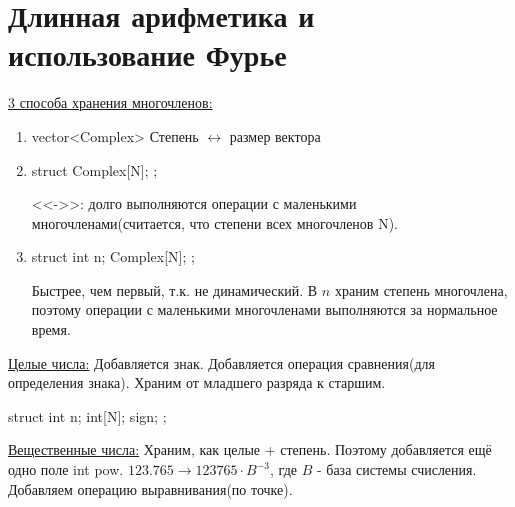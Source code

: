 ﻿\section{Длинная арифметика и использование Фурье}

\underline{3 способа хранения многочленов:}
\begin{enumerate}
	\item vector<Complex> Степень $\leftrightarrow$ размер вектора
	\item 
		\begin{cppcode}
struct{
	Complex[N];
};
		\end{cppcode}
		<<->>: долго выполняются операции с маленькими многочленами(считается, что степени всех многочленов N).
	\item 
		\begin{cppcode}
struct{
	int n;
	Complex[N];
};
		\end{cppcode}
		Быстрее, чем первый, т.к. не динамический. В $n$ храним степень многочлена, поэтому операции с маленькими 
		многочленами выполняются за нормальное время. 
\end{enumerate}

\underline{Целые числа:}
	Добавляется знак. Добавляется операция сравнения(для определения знака). Храним от младшего разряда к старшим.
	\begin{cppcode}
struct{
	int n;
	int[N];
	sign;
};
	\end{cppcode}

\underline{Вещественные числа:}
	Храним, как целые + степень. Поэтому добавляется ещё одно поле int pow. 
	$123.765 \rightarrow 123765 \cdot B^{-3}$, где $B$ - база системы счисления.
	Добавляем операцию выравнивания(по точке). \\


